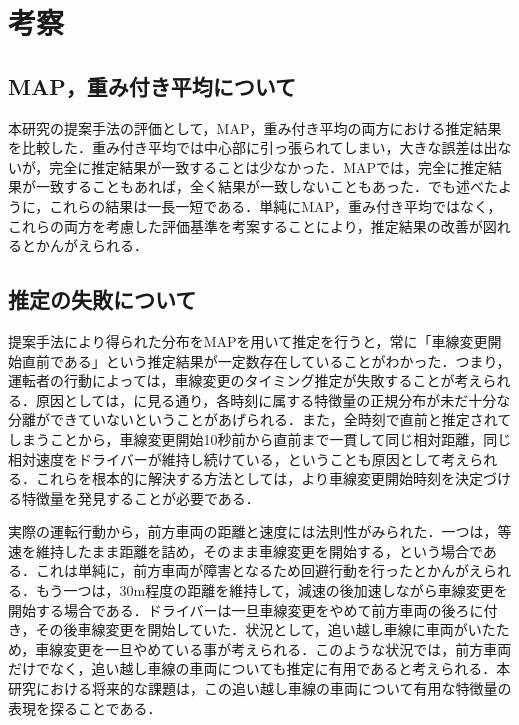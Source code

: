 \chapter{考察}
\section{MAP，重み付き平均について}
本研究の提案手法の評価として，MAP，重み付き平均の両方における推定結果を比較した．重み付き平均では中心部に引っ張られてしまい，大きな誤差は出ないが，完全に推定結果が一致することは少なかった．MAPでは，完全に推定結果が一致することもあれば，全く結果が一致しないこともあった．でも述べたように，これらの結果は一長一短である．単純にMAP，重み付き平均ではなく，これらの両方を考慮した評価基準を考案することにより，推定結果の改善が図れるとかんがえられる．
\section{推定の失敗について}
提案手法により得られた分布をMAPを用いて推定を行うと，常に「車線変更開始直前である」という推定結果が一定数存在していることがわかった．つまり，運転者の行動によっては，車線変更のタイミング推定が失敗することが考えられる．原因としては，に見る通り，各時刻に属する特徴量の正規分布が未だ十分な分離ができていないということがあげられる．また，全時刻で直前と推定されてしまうことから，車線変更開始10秒前から直前まで一貫して同じ相対距離，同じ相対速度をドライバーが維持し続けている，ということも原因として考えられる．これらを根本的に解決する方法としては，より車線変更開始時刻を決定づける特徴量を発見することが必要である．
\par
実際の運転行動から，前方車両の距離と速度には法則性がみられた．一つは，等速を維持したまま距離を詰め，そのまま車線変更を開始する，という場合である．これは単純に，前方車両が障害となるため回避行動を行ったとかんがえられる．もう一つは，30m程度の距離を維持して，減速の後加速しながら車線変更を開始する場合である．ドライバーは一旦車線変更をやめて前方車両の後ろに付き，その後車線変更を開始していた．状況として，追い越し車線に車両がいたため，車線変更を一旦やめている事が考えられる．このような状況では，前方車両だけでなく，追い越し車線の車両についても推定に有用であると考えられる．本研究における将来的な課題は，この追い越し車線の車両について有用な特徴量の表現を探ることである．



\par
